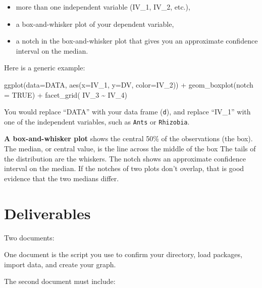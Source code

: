\documentclass[
  letterpaper,
  DIV=11,
  numbers=noendperiod]{scrreprt}
\newenvironment{Shaded}{\begin{snugshade}}{\end{snugshade}}
\newcommand{\AttributeTok}[1]{\textcolor[rgb]{0.40,0.45,0.13}{#1}}
\newcommand{\ConstantTok}[1]{\textcolor[rgb]{0.56,0.35,0.01}{#1}}
\newcommand{\FunctionTok}[1]{\textcolor[rgb]{0.28,0.35,0.67}{#1}}
\newcommand{\NormalTok}[1]{\textcolor[rgb]{0.00,0.23,0.31}{#1}}
\newcommand{\SpecialCharTok}[1]{\textcolor[rgb]{0.37,0.37,0.37}{#1}}
\providecommand{\tightlist}{%
  \setlength{\itemsep}{0pt}\setlength{\parskip}{0pt}}
\begin{document}
\begin{itemize}
\tightlist
\item
  more than one independent variable (IV\_1, IV\_2, etc.),
\item
  a box-and-whisker plot of your dependent variable,
\item
  a notch in the box-and-whisker plot that gives you an approximate
  confidence interval on the median.
\end{itemize}

Here is a generic example:

\begin{Shaded}
\begin{Highlighting}[]
\FunctionTok{ggplot}\NormalTok{(}\AttributeTok{data=}\NormalTok{DATA, }\FunctionTok{aes}\NormalTok{(}\AttributeTok{x=}\NormalTok{IV\_1, }\AttributeTok{y=}\NormalTok{DV, }\AttributeTok{color=}\NormalTok{IV\_2)) }\SpecialCharTok{+} 
  \FunctionTok{geom\_boxplot}\NormalTok{(}\AttributeTok{notch =} \ConstantTok{TRUE}\NormalTok{) }\SpecialCharTok{+} 
  \FunctionTok{facet\_grid}\NormalTok{( IV\_3 }\SpecialCharTok{\textasciitilde{}}\NormalTok{ IV\_4)}
\end{Highlighting}
\end{Shaded}

You would replace ``DATA'' with your data frame (\texttt{d}), and
replace ``IV\_1'' with one of the independent variables, such as
\texttt{Ants} or \texttt{Rhizobia}.

\textbf{A box-and-whisker plot} shows the central 50\% of the
observations (the box). The median, or central value, is the line across
the middle of the box The tails of the distribution are the whiskers.
The notch shows an approximate confidence interval on the median. If the
notches of two plots don't overlap, that is good evidence that the two
medians differ.

\section{Deliverables}\label{deliverables-7}

Two documents:

One document is the script you use to confirm your directory, load
packages, import data, and create your graph.

The second document must include:
\end{document}
